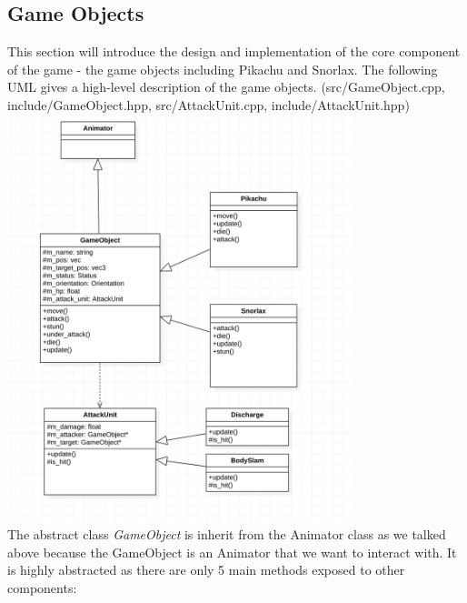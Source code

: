 \documentclass {article}
\begin{document}
\subsection{Game Objects}
This section will introduce the design and implementation of the core component of the game - the game objects including Pikachu and Snorlax. The following UML gives a high-level
description of the game objects. (src/GameObject.cpp, include/GameObject.hpp, src/AttackUnit.cpp, include/AttackUnit.hpp)\\
\includegraphics[width=100mm]{uml_gameobject.png} \\
The abstract class \textit{GameObject} is inherit from the Animator class as we talked above because the GameObject is an Animator that we want to interact with. It is highly abstracted as there are only 
5 main methods exposed to other components:
\end{document}
